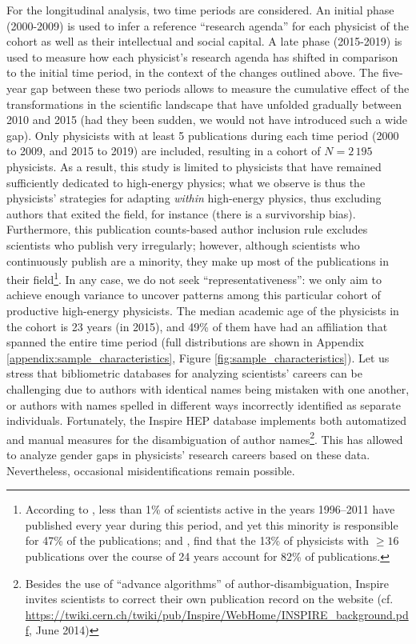 \documentclass{article}
\begin{document}
For the longitudinal analysis, two time periods are considered. An initial phase (2000-2009) is used to infer a reference ``research agenda'' for each physicist of the cohort as well as their intellectual and social capital. A late phase (2015-2019) is used to measure how each physicist's research agenda has shifted in comparison to the initial time period, in the context of the changes outlined above. The five-year gap between these two periods allows to measure the cumulative effect of the transformations in the scientific landscape that have unfolded gradually between 2010 and 2015 (had they been sudden, we would not have introduced such a wide gap). Only physicists with at least 5 publications during each time period (2000 to 2009, and 2015 to 2019) are included, resulting in a cohort of $N=2\,195$ physicists. As a result, this study is limited to physicists that have remained sufficiently dedicated to high-energy physics; what we observe is thus the physicists' strategies for adapting \textit{within} high-energy physics, thus excluding authors that exited the field, for instance (there is a survivorship bias). Furthermore, this publication counts-based author inclusion rule excludes scientists who publish very irregularly; however, although scientists who continuously publish are a minority, they make up most of the publications in their field\footnote{According to  \citet{Ioannidis2014}, less than 1\% of scientists active in the years 1996–2011 have published every year during this period, and yet this minority is responsible for 47\% of the publications; and \citet{Feifan2023}, find that the 13\% of physicists with $\geq 16$ publications over the course of 24 years account for 82\% of publications.}. In any case, we do not seek ``representativeness'': we only aim to achieve enough variance to uncover patterns among this particular cohort of productive high-energy physicists. The median academic age of the physicists in the cohort is 23 years (in 2015), and 49\% of them have had an affiliation that spanned the entire time period (full distributions are shown in Appendix \ref{appendix:sample_characteristics}, Figure \ref{fig:sample_characteristics}). Let us stress that bibliometric databases for analyzing scientists' careers can be challenging due to authors with identical names being mistaken with one another, or authors with names spelled in different ways incorrectly identified as separate individuals. Fortunately, the Inspire HEP database implements both automatized and manual measures for the disambiguation of author names\footnote{Besides the use of ``advance algorithms'' of author-disambiguation, Inspire invites scientists to correct their own publication record on the website (cf. \url{https://twiki.cern.ch/twiki/pub/Inspire/WebHome/INSPIRE_background.pdf}, June 2014)}. %
This has allowed \citet{Strumia2021} to analyze gender gaps in physicists' research careers based on these data. Nevertheless, occasional misidentifications remain possible.
\end{document}

